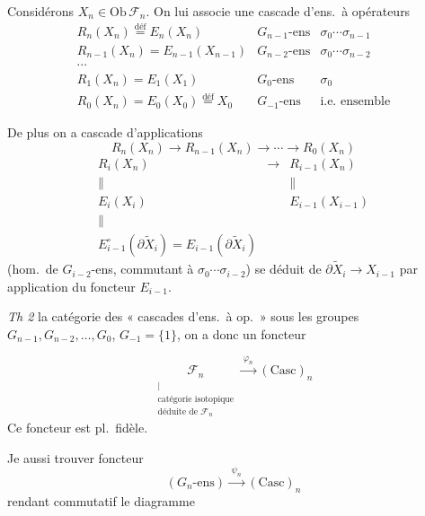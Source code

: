 \documentclass[11pt,a4paper]{article}
\begin{document}
Considérons $X_n \in \mathrm{Ob}\,\mathcal{F}_n$. On lui associe une
cascade d'ens.\ à opérateurs
\[
  \begin{array}{lll}
    R_n(X_n) \overset{\text{déf}}{=} E_n(X_n) & G_{n-1}\text{-ens} &
    \sigma_0 \cdots \sigma_{n-1} \\
    R_{n-1}(X_n) = E_{n-1}(X_{n-1}) & G_{n-2}\text{-ens} & \sigma_0 \cdots
    \sigma_{n-2} \\
    \cdots & & \\
    R_1(X_n) = E_1(X_1) & G_0\text{-ens} & \sigma_0 \\
    R_0(X_n) = E_0(X_0) \overset{\text{déf}}{=} X_0 & G_{-1}\text{-ens} &
    \text{i.e.\ ensemble}
  \end{array}
\]

De plus on a \struck{\ill{}}  cascade d'applications
\[
  R_n(X_n) \to R_{n-1}(X_n) \to \cdots \to R_0(X_n)
\]
 \add{\ill{}}
\[
  \begin{array}{ccc}
    R_i(X_n) & \longrightarrow & R_{i-1}(X_n) \\
    \| & & \| \\
    E_i(X_i) & & E_{i-1}(X_{i-1}) \\
    \| & & \\
    E^\circ_{i-1}(\partial\widetilde{X}_i) = E_{i-1}(\partial\widetilde{X}_i)
    & &
  \end{array}
\]
(hom.\ de $G_{i-2}$-ens, commutant à $\sigma_0 \cdots \sigma_{i-2}$) se
déduit de $\partial\widetilde{X}_i \to X_{i-1}$ par application du
foncteur $E_{i-1}$.

\emph{Th 2}   
la catégorie des « cascades d'ens.\ à op.\ » sous les groupes $G_{n-1},
G_{n-2}, \ldots, G_0$, $G_{-1} = \lbrace 1 \rbrace$, on a donc un foncteur

\[
  \underset{\substack{| \\ \text{catégorie isotopique} \\ \text{déduite de }
  \mathcal{F}_n}}{\mathcal{F}_n} \xrightarrow{\;\varphi_n\;}
  (\mathrm{Casc})_n
\]
Ce foncteur est pl.\ fidèle.

Je  aussi trouver   foncteur
 \struck{\ill{}}
\[
  (G_n\text{-ens}) \xrightarrow{\;\psi_n\;} (\mathrm{Casc})_n
\]
rendant commutatif le diagramme
\end{document}
